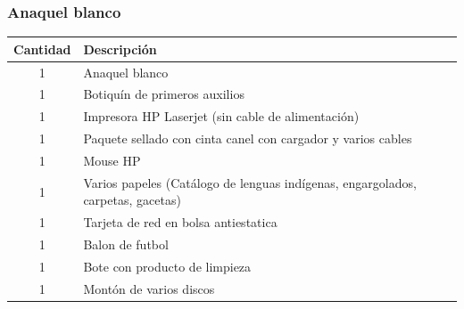 \documentclass[a4paper,11pt]{article}                 %
\begin{document}
  \subsubsection*{Anaquel blanco}
    \begin{table}[H]
    \centering
    \begin{tabular}{|c|l|}
    \hline
    Cantidad & Descripción                                                                     \\ \hline
    1        & Anaquel blanco                                                                  \\ \hline
    1        & Botiquín de primeros auxilios                                                   \\ \hline
    1        & Impresora HP Laserjet (sin cable de alimentación)                               \\ \hline
    1        & Paquete sellado con cinta canel con cargador y varios cables                    \\ \hline
    1        & Mouse HP                                                                        \\ \hline
    1        & Varios papeles (Catálogo de lenguas indígenas, engargolados, carpetas, gacetas) \\ \hline
    1        & Tarjeta de red en bolsa antiestatica                                            \\ \hline
    1        & Balon de futbol                                                                 \\ \hline  
    1        & Bote con producto de limpieza                                                   \\ \hline  
    1        & Montón de varios discos                                                         \\ \hline
    \end{tabular}
    \end{table} 
\end{document}
